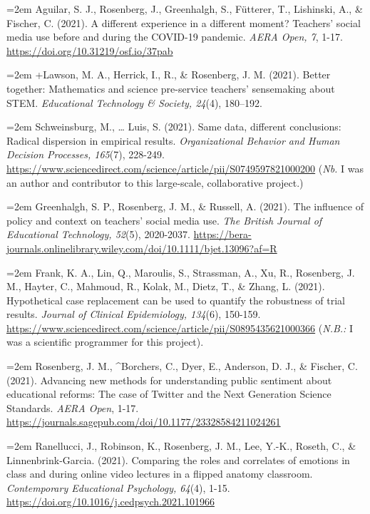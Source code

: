 \documentclass[
  14,
]{article}
\begin{document}
\hangindent=2em Aguilar, S. J., Rosenberg, J., Greenhalgh, S., Fütterer,
T., Lishinski, A., \& Fischer, C. (2021). A different experience in a
different moment? Teachers' social media use before and during the
COVID-19 pandemic. \emph{AERA Open, 7}, 1-17.
\url{https://doi.org/10.31219/osf.io/37pab}

\hangindent=2em +Lawson, M. A., Herrick, I., R., \& Rosenberg, J. M.
(2021). Better together: Mathematics and science pre-service teachers'
sensemaking about STEM. \emph{Educational Technology \& Society, 24}(4),
180--192.

\hangindent=2em Schweinsburg, M., \ldots{} Luis, S. (2021). Same data,
different conclusions: Radical dispersion in empirical results.
\emph{Organizational Behavior and Human Decision Processes, 165}(7),
228-249.
\url{https://www.sciencedirect.com/science/article/pii/S0749597821000200}
(\emph{Nb.} I was an author and contributor to this large-scale,
collaborative project.)

\hangindent=2em Greenhalgh, S. P., Rosenberg, J. M., \& Russell, A.
(2021). The influence of policy and context on teachers' social media
use. \emph{The British Journal of Educational Technology, 52}(5),
2020-2037.
\url{https://bera-journals.onlinelibrary.wiley.com/doi/10.1111/bjet.13096?af=R}

\hangindent=2em Frank, K. A., Lin, Q., Maroulis, S., Strassman, A., Xu,
R., Rosenberg, J. M., Hayter, C., Mahmoud, R., Kolak, M., Dietz, T., \&
Zhang, L. (2021). Hypothetical case replacement can be used to quantify
the robustness of trial results. \emph{Journal of Clinical Epidemiology,
134}(6), 150-159.
\url{https://www.sciencedirect.com/science/article/pii/S0895435621000366}
(\emph{N.B.:} I was a scientific programmer for this project).

\hangindent=2em Rosenberg, J. M., \^{}Borchers, C., Dyer, E., Anderson,
D. J., \& Fischer, C. (2021). Advancing new methods for understanding
public sentiment about educational reforms: The case of Twitter and the
Next Generation Science Standards. \emph{AERA Open}, 1-17.
\url{https://journals.sagepub.com/doi/10.1177/23328584211024261}

\hangindent=2em Ranellucci, J., Robinson, K., Rosenberg, J. M., Lee,
Y.-K., Roseth, C., \& Linnenbrink-Garcia. (2021). Comparing the roles
and correlates of emotions in class and during online video lectures in
a flipped anatomy classroom. \emph{Contemporary Educational Psychology,
64}(4), 1-15. \url{https://doi.org/10.1016/j.cedpsych.2021.101966}
\end{document}
